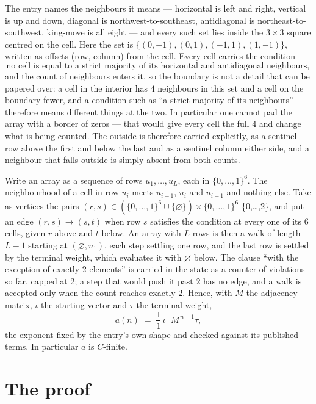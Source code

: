 \documentclass[11pt,a4paper]{article}
\theoremstyle{plain}
\theoremstyle{definition}
\begin{document}
The entry names the neighbours it means --- horizontal is left and right, vertical is up and
down, diagonal is northwest-to-southeast, antidiagonal is northeast-to-southwest, king-move is
all eight --- and every such set lies inside the $3\times3$ square centred on the cell. Here
the set is $\{(0,-1), (0,1), (-1,1), (1,-1)\}$, written as offsets (row, column) from the cell. Every cell carries
the condition
\[
\text{no cell is equal to a strict majority of its horizontal and antidiagonal neighbours},
\]
and the count of neighbours enters it, so the boundary is not a detail that can be papered
over: a cell in the interior has $4$ neighbours in this set and a cell on the boundary
fewer, and a condition such as ``a strict majority of its neighbours'' therefore means
different things at the two. In particular one cannot pad the array with a border of zeros ---
that would give every cell the full $4$ and change what is being counted. The outside is
therefore carried
explicitly, as a sentinel row above the first and below the last and as a sentinel column
either side, and a neighbour that falls outside is simply absent from both counts.

Write an array as a sequence of rows $u_1,\dots,u_L$, each in
$\{0,\dots,1\}^{6}$. The neighbourhood of a cell in row $u_i$ meets $u_{i-1}$,
$u_i$ and $u_{i+1}$ and nothing else. Take as vertices the pairs
$(r,s)\in(\{0,\dots,1\}^{6}\cup\{\varnothing\})\times\{0,\dots,1\}^{6}$ \times \{0,\dots,2\},
and put an edge $(r,s)\to(s,t)$ when row $s$ satisfies the condition at every one of its
$6$ cells, given $r$ above and $t$ below. An array with $L$ rows is then a walk of length
$L-1$ starting at $(\varnothing,u_1)$, each step settling one row, and the last row is
settled by the terminal weight, which evaluates it with $\varnothing$ below. The clause ``with the exception of exactly $2$ elements'' is carried in
the state as a counter of violations so far, capped at $2$; a step that would push it past
$2$ has no edge, and a walk is accepted only when the count reaches exactly $2$. Hence,
with $M$ the adjacency matrix, $\iota$ the starting vector and $\tau$ the terminal weight,
\[
a(n)\;=\;\frac{1}{1}\,\iota^{\!\top}M^{\,n-1}\tau ,
\]
the exponent fixed by the entry's own shape and checked against its published terms. In
particular $a$ is $C$-finite.

\section{The proof}
\end{document}

